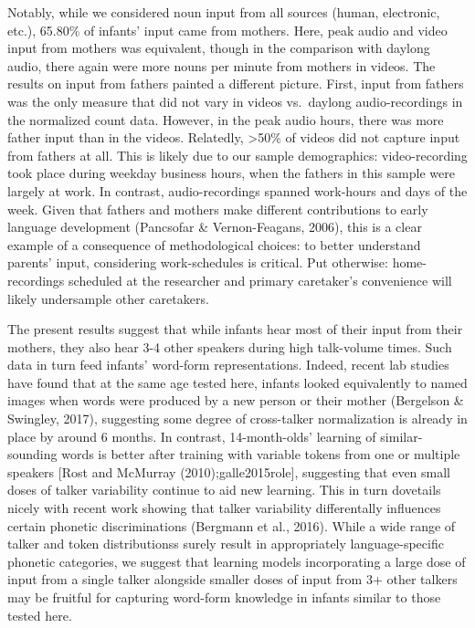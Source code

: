 \documentclass[man]{apa6}
\theoremstyle{definition}
\theoremstyle{definition}
\theoremstyle{definition}
\theoremstyle{remark}
\begin{document}
Notably, while we considered noun input from all sources (human,
electronic, etc.), 65.80\% of infants' input came from mothers. Here,
peak audio and video input from mothers was equivalent, though in the
comparison with daylong audio, there again were more nouns per minute
from mothers in videos. The results on input from fathers painted a
different picture. First, input from fathers was the only measure that
did not vary in videos vs.~daylong audio-recordings in the normalized
count data. However, in the peak audio hours, there was more father
input than in the videos. Relatedly, \textgreater{}50\% of videos did
not capture input from fathers at all. This is likely due to our sample
demographics: video-recording took place during weekday business hours,
when the fathers in this sample were largely at work. In contrast,
audio-recordings spanned work-hours and days of the week. Given that
fathers and mothers make different contributions to early language
development (Pancsofar \& Vernon-Feagans, 2006), this is a clear example
of a consequence of methodological choices: to better understand
parents' input, considering work-schedules is critical. Put otherwise:
home-recordings scheduled at the researcher and primary caretaker's
convenience will likely undersample other caretakers.

The present results suggest that while infants hear most of their input
from their mothers, they also hear 3-4 other speakers during high
talk-volume times. Such data in turn feed infants' word-form
representations. Indeed, recent lab studies have found that at the same
age tested here, infants looked equivalently to named images when words
were produced by a new person or their mother (Bergelson \& Swingley,
2017), suggesting some degree of cross-talker normalization is already
in place by around 6 months. In contrast, 14-month-olds' learning of
similar-sounding words is better after training with variable tokens
from one or multiple speakers {[}Rost and McMurray
(2010);galle2015role{]}, suggesting that even small doses of talker
variability continue to aid new learning. This in turn dovetails nicely
with recent work showing that talker variability differentally
influences certain phonetic discriminations (Bergmann et al., 2016).
While a wide range of talker and token distributionss surely result in
appropriately language-specific phonetic categories, we suggest that
learning models incorporating a large dose of input from a single talker
alongside smaller doses of input from 3+ other talkers may be fruitful
for capturing word-form knowledge in infants similar to those tested
here.
\end{document}
